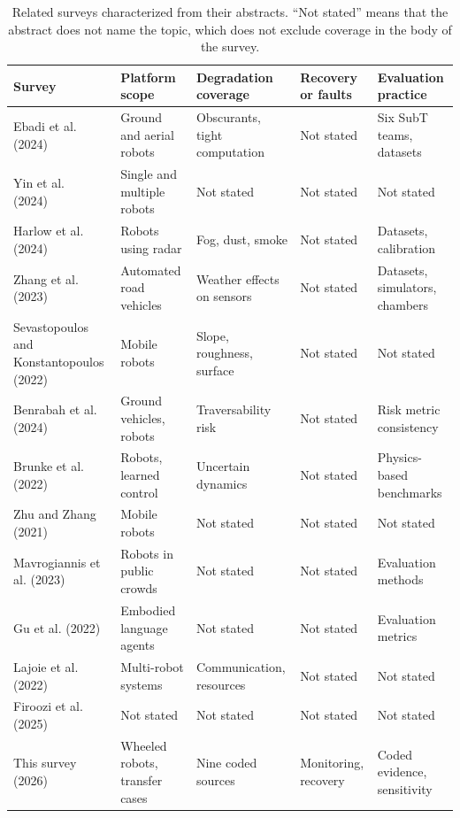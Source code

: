 \begin{table}[t]
\centering
\caption{Related surveys characterized from their abstracts. ``Not stated'' means that the abstract does not name the topic, which does not exclude coverage in the body of the survey.}
\label{tab:related-reviews}
\surveytableformat
\begin{tabularx}{\linewidth}{@{}L{4.1cm}L{3.4cm}L{3.5cm}L{2.0cm}Y@{}}
\toprule
\textbf{Survey} & \textbf{Platform scope} & \textbf{Degradation coverage} & \textbf{Recovery or faults} & \textbf{Evaluation practice} \\
\midrule
Ebadi et al. (2024)~\cite{B_SubTSLAM2024} & Ground and aerial robots & Obscurants, tight computation & Not stated & Six SubT teams, datasets \\
Yin et al. (2024)~\cite{B_GlobalLiDARLoc2024} & Single and multiple robots & Not stated & Not stated & Not stated \\
Harlow et al. (2024)~\cite{B_RadarSurvey2024} & Robots using radar & Fog, dust, smoke & Not stated & Datasets, calibration \\
Zhang et al. (2023)~\cite{B_AdverseWeather2023} & Automated road vehicles & Weather effects on sensors & Not stated & Datasets, simulators, chambers \\
Sevastopoulos and Konstantopoulos (2022)~\cite{B_Traversability2022} & Mobile robots & Slope, roughness, surface & Not stated & Not stated \\
Benrabah et al. (2024)~\cite{B_TraversabilityRisk2024} & Ground vehicles, robots & Traversability risk & Not stated & Risk metric consistency \\
Brunke et al. (2022)~\cite{B_SafeLearning2022} & Robots, learned control & Uncertain dynamics & Not stated & Physics-based benchmarks \\
Zhu and Zhang (2021)~\cite{P_X04} & Mobile robots & Not stated & Not stated & Not stated \\
Mavrogiannis et al. (2023)~\cite{B_SocialNav2023} & Robots in public crowds & Not stated & Not stated & Evaluation methods \\
Gu et al. (2022)~\cite{B_VLNSurvey2022} & Embodied language agents & Not stated & Not stated & Evaluation metrics \\
Lajoie et al. (2022)~\cite{B_CSLAM2022} & Multi-robot systems & Communication, resources & Not stated & Not stated \\
Firoozi et al. (2025)~\cite{B_Foundation2024} & Not stated & Not stated & Not stated & Not stated \\
\midrule
This survey (2026) & Wheeled robots, transfer cases & Nine coded sources & Monitoring, recovery & Coded evidence, sensitivity \\
\bottomrule
\end{tabularx}
\end{table}
